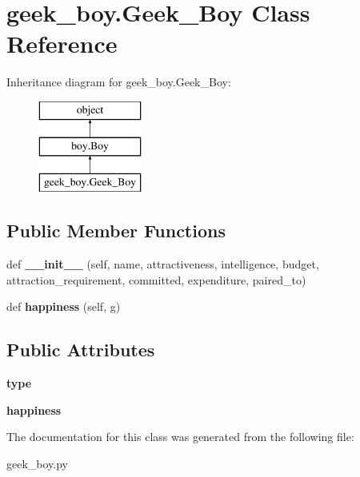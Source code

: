 \hypertarget{classgeek__boy_1_1_geek___boy}{}\section{geek\+\_\+boy.\+Geek\+\_\+\+Boy Class Reference}
\label{classgeek__boy_1_1_geek___boy}
Inheritance diagram for geek\+\_\+boy.\+Geek\+\_\+\+Boy\+:\begin{figure}[H]
\begin{center}
\leavevmode
\includegraphics[height=3.000000cm]{classgeek__boy_1_1_geek___boy}
\end{center}
\end{figure}
\subsection*{Public Member Functions}
\begin{DoxyCompactItemize}
\item 
\mbox{\label{classgeek__boy_1_1_geek___boy_ae4df402c3dda6877a3957e4bdd41b228}} 
def {\bfseries \+\_\+\+\_\+init\+\_\+\+\_\+} (self, name, attractiveness, intelligence, budget, attraction\+\_\+requirement, committed, expenditure, paired\+\_\+to)
\item 
\mbox{\label{classgeek__boy_1_1_geek___boy_a651f4b0e255c1585737ffd0a93099edd}} 
def {\bfseries happiness} (self, g)
\end{DoxyCompactItemize}
\subsection*{Public Attributes}
\begin{DoxyCompactItemize}
\item 
\mbox{\label{classgeek__boy_1_1_geek___boy_a3331fb6dfe37cf9913ab14b36b4aa205}} 
{\bfseries type}
\item 
\mbox{\label{classgeek__boy_1_1_geek___boy_a835570f9058c1e3326de0dd3d699de99}} 
{\bfseries happiness}
\end{DoxyCompactItemize}


The documentation for this class was generated from the following file\+:\begin{DoxyCompactItemize}
\item 
geek\+\_\+boy.\+py\end{DoxyCompactItemize}
